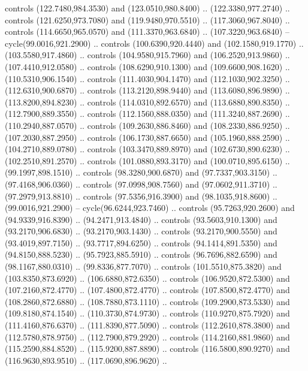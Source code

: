 {{\begin{scope}[shift={(-17.2pt,228.5pt)},y=-0.80pt,x=0.80pt,scale=0.3,transform shape]
        controls (122.7480,984.3530) and (123.0510,980.8400) .. (122.3380,977.2740) ..
        controls (121.6250,973.7080) and (119.9480,970.5510) .. (117.3060,967.8040) ..
        controls (114.6650,965.0570) and (111.3370,963.6840) .. (107.3220,963.6840) --
        cycle(99.0016,921.2900) .. controls (100.6390,920.4440) and
        (102.1580,919.1770) .. (103.5580,917.4860) .. controls (104.9580,915.7960) and
        (106.2520,913.9860) .. (107.4410,912.0580) .. controls (108.6290,910.1300) and
        (109.6600,908.1620) .. (110.5310,906.1540) .. controls (111.4030,904.1470) and
        (112.1030,902.3250) .. (112.6310,900.6870) .. controls (113.2120,898.9440) and
        (113.6080,896.9890) .. (113.8200,894.8230) .. controls (114.0310,892.6570) and
        (113.6880,890.8350) .. (112.7900,889.3550) .. controls (112.1560,888.0350) and
        (111.3240,887.2690) .. (110.2940,887.0570) .. controls (109.2630,886.8460) and
        (108.2330,886.9250) .. (107.2030,887.2950) .. controls (106.1730,887.6650) and
        (105.1960,888.2590) .. (104.2710,889.0780) .. controls (103.3470,889.8970) and
        (102.6730,890.6230) .. (102.2510,891.2570) .. controls (101.0880,893.3170) and
        (100.0710,895.6150) .. (99.1997,898.1510) .. controls (98.3280,900.6870) and
        (97.7337,903.3150) .. (97.4168,906.0360) .. controls (97.0998,908.7560) and
        (97.0602,911.3710) .. (97.2979,913.8810) .. controls (97.5356,916.3900) and
        (98.1035,918.8600) .. (99.0016,921.2900) -- cycle(96.6244,923.7460) ..
        controls (95.7263,920.2600) and (94.9339,916.8390) .. (94.2471,913.4840) ..
        controls (93.5603,910.1300) and (93.2170,906.6830) .. (93.2170,903.1430) ..
        controls (93.2170,900.5550) and (93.4019,897.7150) .. (93.7717,894.6250) ..
        controls (94.1414,891.5350) and (94.8150,888.5230) .. (95.7923,885.5910) ..
        controls (96.7696,882.6590) and (98.1167,880.0310) .. (99.8336,877.7070) ..
        controls (101.5510,875.3820) and (103.8350,873.6920) .. (106.6880,872.6350) ..
        controls (106.9520,872.5300) and (107.2160,872.4770) .. (107.4800,872.4770) ..
        controls (107.8500,872.4770) and (108.2860,872.6880) .. (108.7880,873.1110) ..
        controls (109.2900,873.5330) and (109.8180,874.1540) .. (110.3730,874.9730) ..
        controls (110.9270,875.7920) and (111.4160,876.6370) .. (111.8390,877.5090) ..
        controls (112.2610,878.3800) and (112.5780,878.9750) .. (112.7900,879.2920) ..
        controls (114.2160,881.9860) and (115.2590,884.8520) .. (115.9200,887.8890) ..
        controls (116.5800,890.9270) and (116.9630,893.9510) .. (117.0690,896.9620) ..

\end{scope}}}
